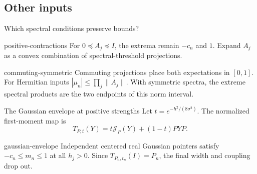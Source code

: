 \documentclass{beamer}
\begin{document}
\subsection{Other inputs}
\begin{frame}{Which spectral conditions preserve bounds?}
\begin{bookresult}{positive-contractions}
For $0\preceq A_j\preceq I$, the extrema remain $-c_n$ and $1$. Expand $A_j$ as a convex combination of spectral-threshold projections.
\end{bookresult}
\begin{bookresult}{commuting-symmetric}
Commuting projections place both expectations in $[0,1]$. For Hermitian inputs $|\mu_n|\le\prod_j\|A_j\|$. With symmetric spectra, the extreme spectral products are the two endpoints of this norm interval.
\end{bookresult}
\end{frame}

\begin{frame}{The Gaussian envelope at positive strengths}
Let $t=e^{-h^2/(8\sigma^2)}$. The normalized first-moment map is
\[
 T_{P,t}(Y)=t\mathcal J_P(Y)+(1-t)PYP.
\]
\begin{bookresult}{gaussian-envelope}
Independent centered real Gaussian pointers satisfy $-c_n\le m_n\le1$ at all $h_j>0$. Since $T_{P_n,t_n}(I)=P_n$, the final width and coupling drop out.
\end{bookresult}
\end{frame}
\end{document}
